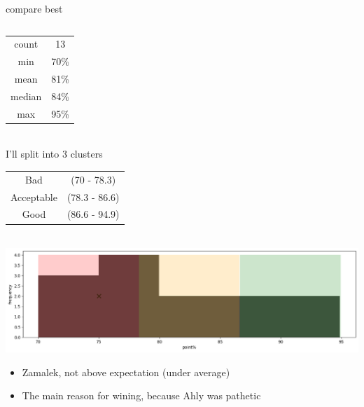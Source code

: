 \documentclass[8pt]{beamer}
\begin{document}
\begin{frame}[t]{compare best}
\begin{columns}
\begin{column}{.7\textwidth}
\begin{center}
                        \begin{tabular}[1]{|c|c|}
                            \hline
                            count & 13\\
                            min & 70\%\\
                            mean & 81\%\\
                            median & 84\%\\
                            max & 95\%\\
                            \hline
                        \end{tabular}
                        \\[5px]
                        I'll split into 3 clusters\\
                        \begin{tabular}{|c|c|}
                            \hline
                            Bad & (70 - 78.3)\\
                            Acceptable & (78.3 - 86.6)\\
                            Good & (86.6 - 94.9)\\
                            \hline
                        \end{tabular}
                        \\[5px]
                        \pause
                        \includegraphics[width=\textwidth]{pics/dist.png}
                    \end{center}
                    \begin{itemize}
                        \item Zamalek, not above expectation (under average)
                        \item The main reason for wining, because Ahly was pathetic
                    \end{itemize}
                \end{column}
            \end{columns}
        \end{frame}
    
\end{document}
